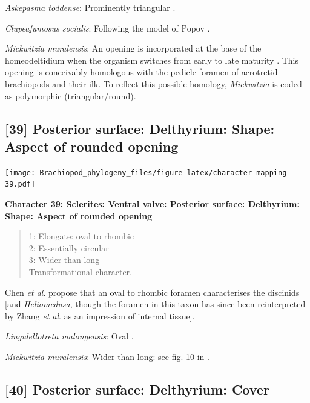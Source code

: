 \documentclass[]{book}
\theoremstyle{definition}
\theoremstyle{definition}
\theoremstyle{definition}
\theoremstyle{remark}
\begin{document}
\emph{Askepasma toddense}: Prominently triangular \citep[see][fig.
2]{Topper2013Theoldest}.

\emph{Clupeafumosus socialis}: Following the model of Popov
\citeyearpar{Popov1992TheCambrian}.

\emph{Mickwitzia muralensis}: An opening is incorporated at the base of
the homeodeltidium when the organism switches from early to late
maturity \citep[fig. 10 in][]{Balthasar2004Shellstructure}. This opening
is conceivably homologous with the pedicle foramen of acrotretid
brachiopods and their ilk. To reflect this possible homology,
\emph{Mickwitzia} is coded as polymorphic (triangular/round).

\hypertarget{posterior-surface-delthyrium-shape-aspect-of-rounded-opening}{%
\subsection*{{[}39{]} Posterior surface: Delthyrium: Shape: Aspect of
rounded
opening}\label{posterior-surface-delthyrium-shape-aspect-of-rounded-opening}}

\texttt{[image: Brachiopod\_phylogeny\_files/figure-latex/character-mapping-39.pdf]}

\textbf{Character 39: Sclerites: Ventral valve: Posterior surface:
Delthyrium: Shape: Aspect of rounded opening}

\begin{quote}
1: Elongate: oval to rhombic\\
2: Essentially circular\\
3: Wider than long\\
Transformational character.
\end{quote}

Chen \emph{et al}. \citeyearpar{Chen2007Reinterpretationof} propose that
an oval to rhombic foramen characterises the discinids {[}and
\emph{Heliomedusa}, though the foramen in this taxon has since been
reinterpreted by Zhang \emph{et al}.
\citeyearpar{Zhang2009Architectureand} as an impression of internal
tissue{]}.

\emph{Lingulellotreta malongensis}: Oval
\citep{Williams2000BrachiopodaLinguliformea}.

\emph{Mickwitzia muralensis}: Wider than long: see fig. 10 in
\citet{Balthasar2004Shellstructure}.

\hypertarget{posterior-surface-delthyrium-cover}{%
\subsection*{{[}40{]} Posterior surface: Delthyrium:
Cover}\label{posterior-surface-delthyrium-cover}}
\end{document}
